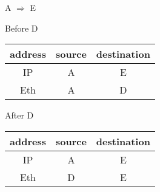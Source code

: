 \begin{frame}{A \(\Rightarrow\) E}
  \begin{minipage}{.45\linewidth}
    \begin{iblock}{Before D}
      \begin{center}
        \begin{tabular}{ccc}
          \toprule
          address & source & destination\\\midrule
          IP & A & E \\
          Eth & A & D \\\bottomrule
        \end{tabular}
      \end{center}
    \end{iblock}
  \end{minipage}\qquad
  \begin{minipage}{.45\linewidth}
    \begin{iblock}{After D}
      \begin{center}
        \begin{tabular}{ccc}
          \toprule
          address & source & destination\\\midrule
          IP & A & E \\
          Eth & D & E \\\bottomrule
        \end{tabular}
      \end{center}
    \end{iblock}
  \end{minipage}
\end{frame}

